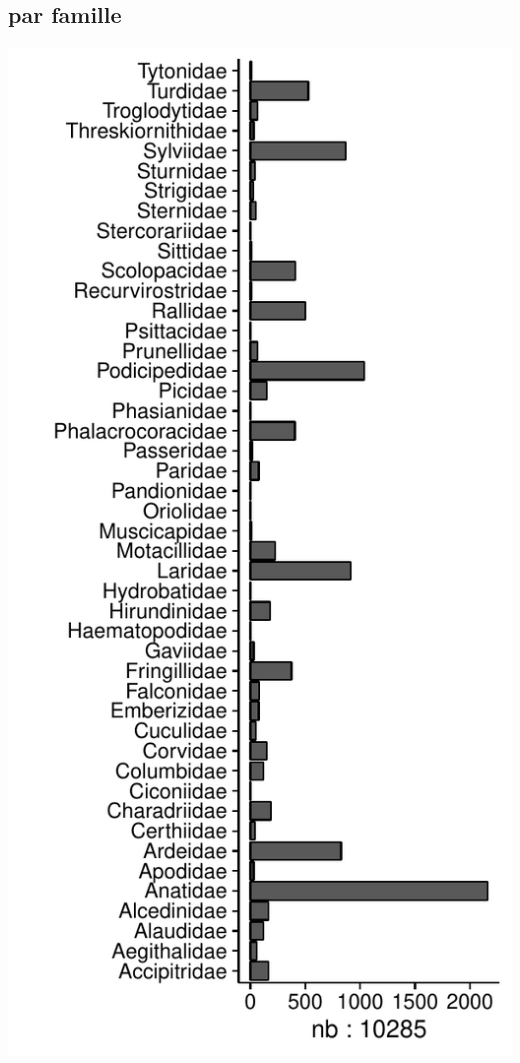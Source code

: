 \subsection*{par famille}
\includegraphics[width=\malargeurgraphique]{images/faune_prec_stat_champ_FAMILY_NAME.pdf}
